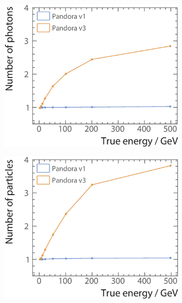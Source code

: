 





\begin{figure}[tbph]
\centering
    \begin{subfigure}[b]{0.45\textwidth}
        \includegraphics[width=\textwidth]{photon/SingleN_p2}
        \caption{}
        \label{fig:photonSingleN_p}
    \end{subfigure}
    \begin{subfigure}[b]{0.45\textwidth}
        \includegraphics[width=\textwidth]{photon/SingleN_all2}

\end{subfigure}
\end{figure}
